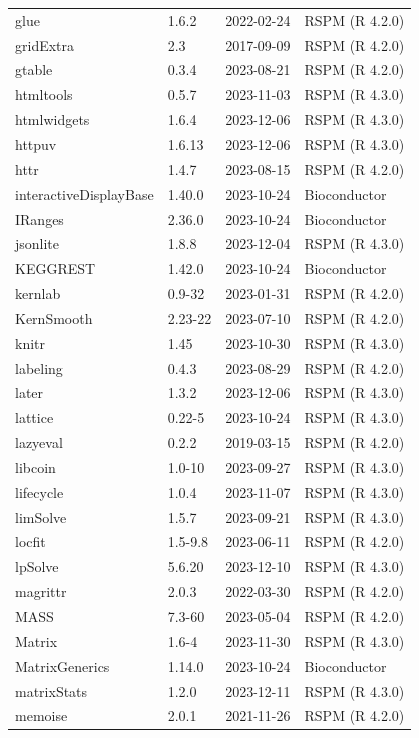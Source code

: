 \documentclass[]{article}
\begin{document}
\begin{longtable}[t]{llll}
glue & 1.6.2 & 2022-02-24 & RSPM (R 4.2.0)\\
gridExtra & 2.3 & 2017-09-09 & RSPM (R 4.2.0)\\
gtable & 0.3.4 & 2023-08-21 & RSPM (R 4.2.0)\\
htmltools & 0.5.7 & 2023-11-03 & RSPM (R 4.3.0)\\
\addlinespace
htmlwidgets & 1.6.4 & 2023-12-06 & RSPM (R 4.3.0)\\
httpuv & 1.6.13 & 2023-12-06 & RSPM (R 4.3.0)\\
httr & 1.4.7 & 2023-08-15 & RSPM (R 4.2.0)\\
interactiveDisplayBase & 1.40.0 & 2023-10-24 & Bioconductor\\
IRanges & 2.36.0 & 2023-10-24 & Bioconductor\\
\addlinespace
jsonlite & 1.8.8 & 2023-12-04 & RSPM (R 4.3.0)\\
KEGGREST & 1.42.0 & 2023-10-24 & Bioconductor\\
kernlab & 0.9-32 & 2023-01-31 & RSPM (R 4.2.0)\\
KernSmooth & 2.23-22 & 2023-07-10 & RSPM (R 4.2.0)\\
knitr & 1.45 & 2023-10-30 & RSPM (R 4.3.0)\\
\addlinespace
labeling & 0.4.3 & 2023-08-29 & RSPM (R 4.2.0)\\
later & 1.3.2 & 2023-12-06 & RSPM (R 4.3.0)\\
lattice & 0.22-5 & 2023-10-24 & RSPM (R 4.3.0)\\
lazyeval & 0.2.2 & 2019-03-15 & RSPM (R 4.2.0)\\
libcoin & 1.0-10 & 2023-09-27 & RSPM (R 4.3.0)\\
\addlinespace
lifecycle & 1.0.4 & 2023-11-07 & RSPM (R 4.3.0)\\
limSolve & 1.5.7 & 2023-09-21 & RSPM (R 4.3.0)\\
locfit & 1.5-9.8 & 2023-06-11 & RSPM (R 4.2.0)\\
lpSolve & 5.6.20 & 2023-12-10 & RSPM (R 4.3.0)\\
magrittr & 2.0.3 & 2022-03-30 & RSPM (R 4.2.0)\\
\addlinespace
MASS & 7.3-60 & 2023-05-04 & RSPM (R 4.2.0)\\
Matrix & 1.6-4 & 2023-11-30 & RSPM (R 4.3.0)\\
MatrixGenerics & 1.14.0 & 2023-10-24 & Bioconductor\\
matrixStats & 1.2.0 & 2023-12-11 & RSPM (R 4.3.0)\\
memoise & 2.0.1 & 2021-11-26 & RSPM (R 4.2.0)\\

\end{longtable}
\end{document}
